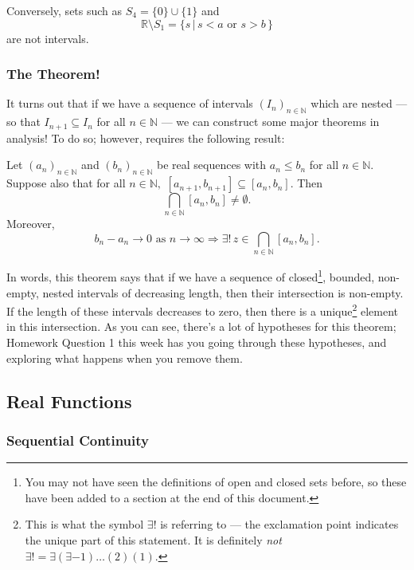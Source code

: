 \documentclass[
  17pt,
  a4paper]{extarticle}
\theoremstyle{plain}
\theoremstyle{plain}
\theoremstyle{plain}
\theoremstyle{plain}
\theoremstyle{plain}
\theoremstyle{definition}
\theoremstyle{definition}
\theoremstyle{definition}
\theoremstyle{remark}
\let\BeginKnitrBlock\begin \let\EndKnitrBlock\end
\renewcommand{\;}{\,}
\begin{document}
Conversely, sets such as \(S_4 = \lbrace 0 \rbrace \cup \lbrace 1 \rbrace\) and \[\mathbb{R}\setminus S_1 = \lbrace s \;\lvert\; s < a \;\; \text{or}\;\; s > b\;\rbrace\] are not intervals.

\hypertarget{the-theorem}{%
\subsubsection{The Theorem!}\label{the-theorem}}

It turns out that if we have a sequence of intervals \((I_n)_{n\in\mathbb{N}}\) which are nested --- so that \(I_{n+1} \subseteq I_n\) for all \(n\in\mathbb{N}\) --- we can construct some major theorems in analysis! To do so; however, requires the following result:

\BeginKnitrBlock{theorem}[Nested Intervals Theorem]
{\label{thm:thm1} }Let \((a_n)_{n\in\mathbb{N}}\) and \((b_n)_{n\in\mathbb{N}}\) be real sequences with \(a_n \leq b_n\) for all \(n\in\mathbb{N}\). Suppose also that for all \(n\in\mathbb{N},\) \([a_{n+1},b_{n+1}] \subseteq [a_{n},b_{n}]\). Then \[\bigcap_{n\in\mathbb{N}}[a_n,b_n] \neq \emptyset.\] Moreover, \[b_n - a_n \to 0 \;\;\text{as $n \to \infty$} \Longrightarrow \exists!\; z \in \bigcap_{n\in\mathbb{N}}[a_n,b_n].\]
\EndKnitrBlock{theorem}
In words, this theorem says that if we have a sequence of closed\footnote{You may not have seen the definitions of open and closed sets before, so these have been added to a section at the end of this document.}, bounded, non-empty, nested intervals of decreasing length, then their intersection is non-empty. If the length of these intervals decreases to zero, then there is a unique\footnote{This is what the symbol \(\exists!\) is referring to --- the exclamation point indicates the unique part of this statement. It is definitely \emph{not} \(\exists! = \exists(\exists-1)\ldots(2)(1).\)} element in this intersection. As you can see, there's a lot of hypotheses for this theorem; Homework Question 1 this week has you going through these hypotheses, and exploring what happens when you remove them.

\hypertarget{sec1}{%
\subsection{Real Functions}\label{sec1}}

\hypertarget{sequential-continuity}{%
\subsubsection{Sequential Continuity}\label{sequential-continuity}}
\end{document}
